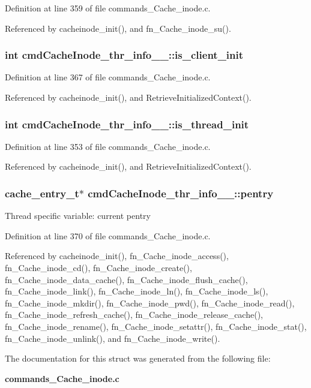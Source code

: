 Definition at line 359 of file commands\_\-Cache\_\-inode.c.

Referenced by cacheinode\_\-init(), and fn\_\-Cache\_\-inode\_\-su().
\subsubsection{\setlength{\rightskip}{0pt plus 5cm}int {\bf cmd\-Cache\-Inode\_\-thr\_\-info\_\-\_\-::is\_\-client\_\-init}}\label{structcmdCacheInode__thr__info_____o4}




Definition at line 367 of file commands\_\-Cache\_\-inode.c.

Referenced by cacheinode\_\-init(), and Retrieve\-Initialized\-Context().
\subsubsection{\setlength{\rightskip}{0pt plus 5cm}int {\bf cmd\-Cache\-Inode\_\-thr\_\-info\_\-\_\-::is\_\-thread\_\-init}}\label{structcmdCacheInode__thr__info_____o0}




Definition at line 353 of file commands\_\-Cache\_\-inode.c.

Referenced by cacheinode\_\-init(), and Retrieve\-Initialized\-Context().
\subsubsection{\setlength{\rightskip}{0pt plus 5cm}cache\_\-entry\_\-t$\ast$ {\bf cmd\-Cache\-Inode\_\-thr\_\-info\_\-\_\-::pentry}}\label{structcmdCacheInode__thr__info_____o5}


Thread specific variable: current pentry 

Definition at line 370 of file commands\_\-Cache\_\-inode.c.

Referenced by cacheinode\_\-init(), fn\_\-Cache\_\-inode\_\-access(), fn\_\-Cache\_\-inode\_\-cd(), fn\_\-Cache\_\-inode\_\-create(), fn\_\-Cache\_\-inode\_\-data\_\-cache(), fn\_\-Cache\_\-inode\_\-flush\_\-cache(), fn\_\-Cache\_\-inode\_\-link(), fn\_\-Cache\_\-inode\_\-ln(), fn\_\-Cache\_\-inode\_\-ls(), fn\_\-Cache\_\-inode\_\-mkdir(), fn\_\-Cache\_\-inode\_\-pwd(), fn\_\-Cache\_\-inode\_\-read(), fn\_\-Cache\_\-inode\_\-refresh\_\-cache(), fn\_\-Cache\_\-inode\_\-release\_\-cache(), fn\_\-Cache\_\-inode\_\-rename(), fn\_\-Cache\_\-inode\_\-setattr(), fn\_\-Cache\_\-inode\_\-stat(), fn\_\-Cache\_\-inode\_\-unlink(), and fn\_\-Cache\_\-inode\_\-write().

The documentation for this struct was generated from the following file:\begin{CompactItemize}
\item 
{\bf commands\_\-Cache\_\-inode.c}\end{CompactItemize}
